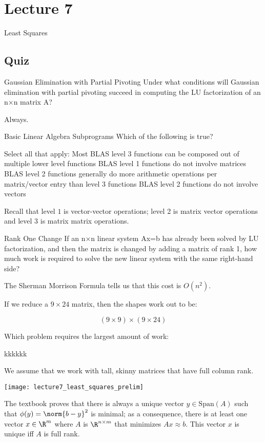 \documentclass[../main.tex]{subfiles}
\begin{document}
\section{Lecture 7}{Least Squares}
\subsection{Quiz}
Gaussian Elimination with Partial Pivoting
Under what conditions will Gaussian elimination with partial pivoting succeed in computing the LU factorization of an n×n matrix A?
\begin{solution}
    Always.
\end{solution}

Basic Linear Algebra Subprograms
Which of the following is true?

Select all that apply:
Most BLAS level 3 functions can be composed out of multiple lower level functions
BLAS level 1 functions do not involve matrices
BLAS level 2 functions generally do more arithmetic operations per matrix/vector entry than level 3 functions
BLAS level 2 functions do not involve vectors
\begin{solution}
    Recall that level $1$ is vector-vector operations; level 2 is matrix vector operations and level $3$ is matrix matrix operations.
\end{solution}

Rank One Change
If an n×n linear system Ax=b has already been solved by LU factorization, and then the matrix is changed by adding a matrix of rank 1, how much work is required to solve the new linear system with the same right-hand side?

\begin{solution}
    The Sherman Morrison Formula tells us that this cost is $O(n^2)$.
\end{solution}

If we reduce a $9 \times 24$ matrix, then the shapes work out to be:

\begin{solution}
    
\[
    (9 \times 9) \times (9 \times 24)
\]
\end{solution}


Which problem requires the largest amount of work:

kkkkkk

\begin{remark}
    We assume that we work with tall, skinny matrices that have full column rank.
\end{remark}
\begin{remark}
    \begin{center}
        \texttt{[image: lecture7\_least\_squares\_prelim]}
    \end{center}
    The textbook proves that there is always a unique vector $y \in \text{Span}(A)$ such that $\phi(y) = \norm{b - y}^2$ is minimal; as a consequence, there is at least one vector $x \in \R^m$ where $A$ is $\R^{n \times m}$ that minimizes $Ax \approx b$. This vector $x$ is unique iff $A$ is full rank.
\end{remark}
\end{document}
